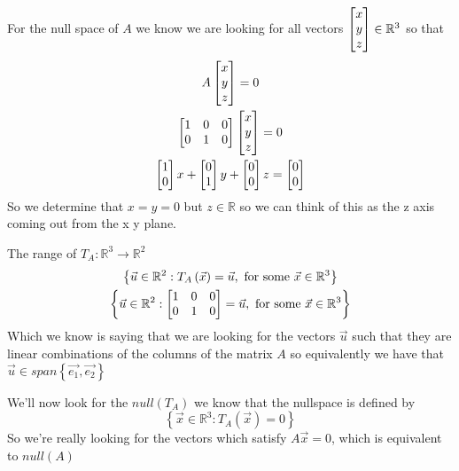 \documentclass[11pt]{book}
\begin{document}
\begin{eg}
    For the null space of $A$ we know we are looking for all vectors $\begin{bmatrix} x \\ y \\ z \end{bmatrix} \in \mathbb{R}^3$ so that
    \begin{gather*}
        A \begin{bmatrix} x \\ y \\ z \end{bmatrix} = 0 \\
        \begin{bmatrix} 1 & 0 & 0 \\ 0 & 1 & 0 \end{bmatrix} \begin{bmatrix} x \\ y  \\ z \end{bmatrix} = 0\\
        \begin{bmatrix} 1 \\ 0 \end{bmatrix}x  + \begin{bmatrix} 0 \\ 1 \end{bmatrix}y   + \begin{bmatrix} 0 \\ 0 \end{bmatrix}z   = \begin{bmatrix} 0 \\ 0 \end{bmatrix}
    \end{gather*}
    So we determine that $x = y = 0$ but $z \in \mathbb{R}$ so we can think of this as the z axis coming out from the x y plane.
\end{eg}

\begin{eg}
    The range of $T_{A} : \mathbb{R}^3 \to \mathbb{R}^2 $ 
    \begin{gather*}
        \left\{ \vec{u} \in \mathbb{R}^2: T_{A}\left(\vec{x}\right) = \vec{u}, \text{ for some } \vec{x} \in \mathbb{R}^3 \right\} \\
        \left\{ \vec{u} \in \mathbb{R}^2: \begin{bmatrix} 1 & 0 & 0 \\ 0 & 1 & 0 \end{bmatrix} = \vec{u}, \text{ for some } \vec{x} \in \mathbb{R}^3 \right\}
    \end{gather*}
    Which we know is saying that we are looking for the vectors $\vec{u}$  such that they are linear combinations of the columns of the matrix $A$ so equivalently we have that $\vec{u} \in \mathit{span} {\left\{ \vec{e_1}, \vec{e_2} \right\}} $ 

    We'll now look for the $\mathit{null} {\left( T_{A} \right)} $ we know that the nullspace is defined by 
    \begin{equation*}
        \left\{ \vec{x} \in \mathbb{R}^3 : T_{A}\left(\vec{x}\right) = 0 \right\}
    \end{equation*}
    So we're really looking for the vectors which satisfy $A \vec{x} = 0$, which is equivalent to $\mathit{null} {\left( A \right)} $ 
\end{eg}
\end{document}
